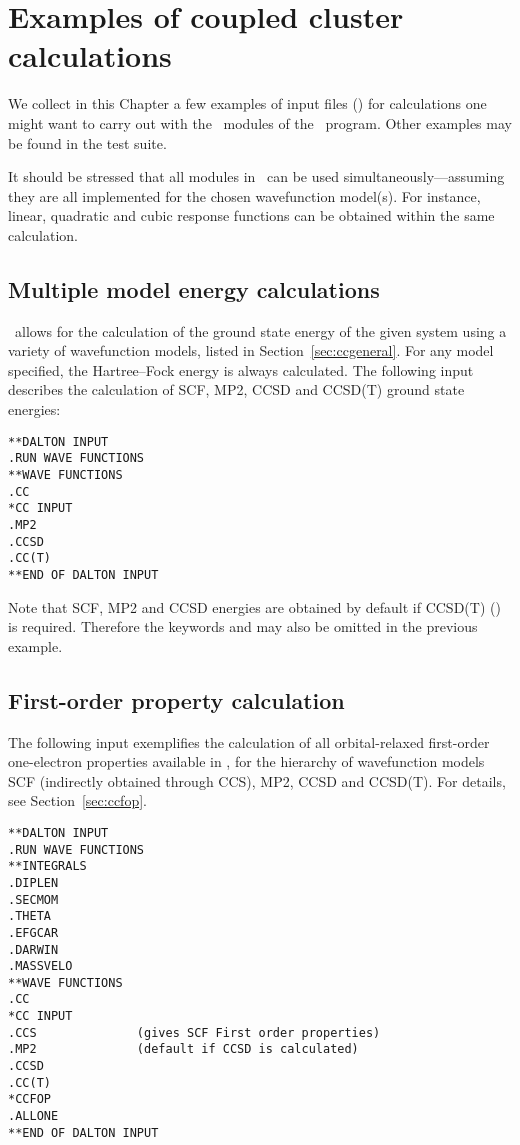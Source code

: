 \chapter{Examples of coupled cluster calculations}
\label{ch:ccexamples}

We collect in this Chapter a few examples of input files (\dalinp) 
for calculations one might want to carry 
out with the \cc\ modules of the \dalton\ program.
Other examples may be found in the test suite. 

It should be stressed that %
all modules in \cc\ can be used 
simultaneously---assuming they are all implemented
for the chosen wavefunction model(s).
For instance,  linear, quadratic and cubic response functions 
can be obtained within the same calculation.

\section{Multiple model energy calculations}
%
\cc\  allows for the calculation of the ground state energy
of the given system using a variety of wavefunction models, listed in 
Section~\ref{sec:ccgeneral}. 
For any model specified, the Hartree--Fock energy is always calculated. 
The following input describes the calculation of SCF, MP2, CCSD and 
CCSD(T) ground state energies:
%
\begin{verbatim}
**DALTON INPUT
.RUN WAVE FUNCTIONS
**WAVE FUNCTIONS
.CC
*CC INPUT
.MP2              
.CCSD
.CC(T)
**END OF DALTON INPUT
\end{verbatim}
Note that SCF, MP2 and CCSD energies are obtained by default if 
CCSD(T) () is required. Therefore the 
keywords  and 
may also be omitted in the previous example.

\section{First-order property calculation}

The following input exemplifies the calculation of all orbital-relaxed
first-order one-electron properties available in \cc, for the hierarchy of 
wavefunction models SCF (indirectly obtained through CCS), MP2, CCSD and CCSD(T).
For details, see Section~\ref{sec:ccfop}.
\begin{verbatim}
**DALTON INPUT
.RUN WAVE FUNCTIONS
**INTEGRALS
.DIPLEN
.SECMOM
.THETA
.EFGCAR
.DARWIN
.MASSVELO
**WAVE FUNCTIONS
.CC
*CC INPUT
.CCS              (gives SCF First order properties)
.MP2              (default if CCSD is calculated)
.CCSD
.CC(T)
*CCFOP
.ALLONE
**END OF DALTON INPUT
\end{verbatim}


